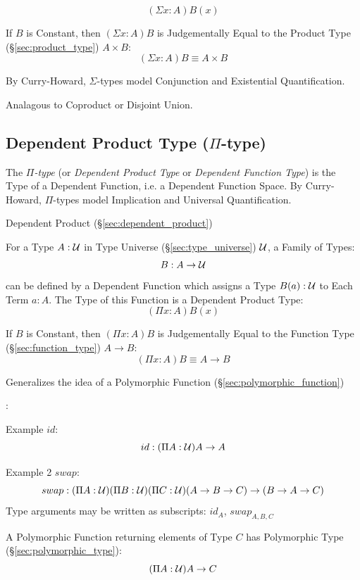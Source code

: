 \[
  (\Sigma x:A) B(x)
\]

If $B$ is Constant, then $(\Sigma x:A)B$ is Judgementally Equal to
the Product Type (\S\ref{sec:product_type}) $A \times B$:
\[
  (\Sigma x:A) B \equiv A \times B
\]

By Curry-Howard, $\Sigma$-types model Conjunction and Existential
Quantification.

Analagous to Coproduct or Disjoint Union.



\subsection{Dependent Product Type ($\Pi$-type)}\label{sec:pi_type}

The \emph{$\Pi$-type} (or \emph{Dependent Product Type} or \emph{Dependent
Function Type}) is the Type of a Dependent Function, i.e. a Dependent Function
Space. By Curry-Howard, $\Pi$-types model Implication and Universal
Quantification.

Dependent Product (\S\ref{sec:dependent_product})

For a Type $A : \mathcal{U}$ in Type Universe
(\S\ref{sec:type_universe}) $\mathcal{U}$, a Family of Types:
\[
  B : A \rightarrow \mathcal{U}
\]
can be defined by a Dependent Function which assigns a Type $B(a) : \mathcal{U}$
to Each Term $a : A$. The Type of this Function is a Dependent Product Type:
\[
  (\Pi x:A)B(x)
\]

If $B$ is Constant, then $(\Pi x:A)B$ is Judgementally Equal to the Function
Type (\S\ref{sec:function_type}) $A \rightarrow B$:
\[
  (\Pi x:A)B \equiv A \rightarrow B
\]

Generalizes the idea of a Polymorphic Function
(\S\ref{sec:polymorphic_function})

\cite{hott13}:

Example $id$:
\[
  id : (\Pi A:\mathcal{U}) A \rightarrow A
\]

Example 2 $swap$:
\[
  swap : (\Pi A:\mathcal{U}) (\Pi B:\mathcal{U}) (\Pi C:\mathcal{U})
  (A \rightarrow B \rightarrow C) \rightarrow (B \rightarrow A
  \rightarrow C)
\]
Type arguments may be written as subscripts: $id_A$, $swap_{A,B,C}$

A Polymorphic Function returning elements of Type $C$ has Polymorphic Type
(\S\ref{sec:polymorphic_type}):
\[
  (\Pi A:\mathcal{U}) A \rightarrow C
\]



